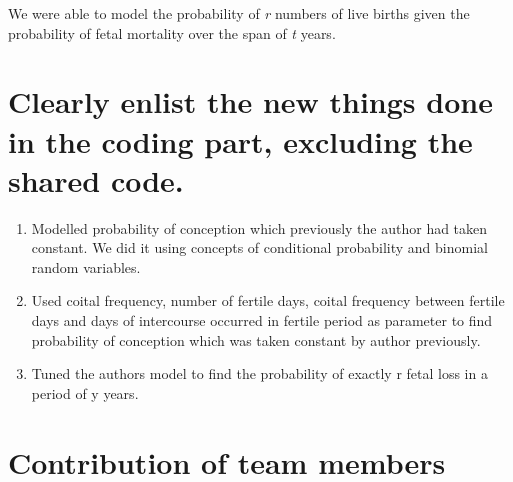 \documentclass{article}
\begin{document}

We were able to model the probability of {\itshape r} numbers of live births given the probability of fetal mortality over the span of {\itshape t} years.


\section{Clearly enlist the new things done in the coding part, excluding the shared code.}

\begin{enumerate}
    \item Modelled probability of conception which previously the author had taken constant. We did it using concepts of conditional probability and binomial random variables.
    \item Used coital frequency, number of fertile days, coital frequency between fertile days and days of intercourse occurred in fertile period as parameter to find probability of conception which was taken constant by author previously.
    \item Tuned the authors model to find the probability of exactly r fetal loss in a period of y years.
\end{enumerate}

\section{Contribution of team members}	
\end{document}
